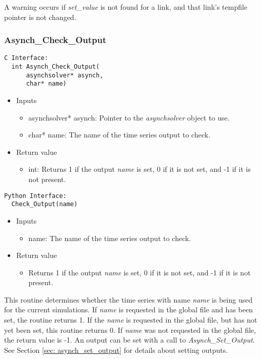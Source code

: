 \documentclass[12pt]{article}
\begin{document}
A warning occurs if \emph{set\_value} is not found for a link, and that link's tempfile pointer is not changed.



\subsubsection{Asynch\_Check\_Output} \label{sec: asynch_check_output}

\begin{lstlisting}[style=CStyle]
  C Interface:
  int Asynch_Check_Output(
      asynchsolver* asynch,
      char* name)
\end{lstlisting}
\begin{itemize}
 \item Inputs
  \begin{itemize}
   \item asynchsolver* asynch: Pointer to the \emph{asynchsolver} object to use.
   \item char* name: The name of the time series output to check.
  \end{itemize}
 \item Return value
  \begin{itemize}
   \item int: Returns 1 if the output \emph{name} is set, 0 if it is not set, and -1 if it is not present.
  \end{itemize}
\end{itemize}
\begin{lstlisting}[style=PythonStyle]
  Python Interface:
  Check_Output(name)
\end{lstlisting}
\begin{itemize}
 \item Inputs
  \begin{itemize}
   \item name: The name of the time series output to check.
  \end{itemize}
 \item Return value
  \begin{itemize}
   \item Returns 1 if the output \emph{name} is set, 0 if it is not set, and -1 if it is not present.
  \end{itemize}
\end{itemize}
This routine determines whether the time series with name \emph{name} is being used for the current simulations. If \emph{name} is requested in the global file and has been set, the routine returns 1. If the \emph{name} is requested in the global file, but has not yet been set, this routine returns 0. If \emph{name} was not requested in the global file, the return value is -1. An output can be set with a call to \emph{Asynch\_Set\_Output}. See Section \ref{sec: asynch_set_output} for details about setting outputs.
\end{document}
